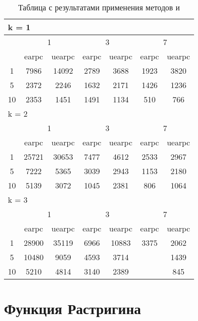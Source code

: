\begin{table}
  \centering
  \begin{tabular}{|*7{c|}}
    \hline
    \multicolumn{7}{|l|}{k = 1} \\
    \hline
    \multirow{2}{*}{\diagbox{$\mu$}{$\lambda$}} & \multicolumn{2}{c|}{1} & \multicolumn{2}{c|}{3} & \multicolumn{2}{c|}{7} \\
    \cline{2-7}
    & earpc & uearpc & earpc & uearpc & earpc & uearpc \\
    \hline
    1 & 7986 & 14092 & 2789 & 3688 & 1923 & 3820 \\
    \hline
    5 & 2372 & 2246 & 1632 & 2171 & 1426 & 1236 \\
    \hline
    10 & 2353 & 1451 & 1491 & 1134 & 510 & 766 \\
    \hline
    \multicolumn{7}{|l|}{k = 2} \\
    \hline
    \multirow{2}{*}{\diagbox{$\mu$}{$\lambda$}} & \multicolumn{2}{c|}{1} & \multicolumn{2}{c|}{3} & \multicolumn{2}{c|}{7} \\
    \cline{2-7}
    & earpc & uearpc & earpc & uearpc & earpc & uearpc \\
    \hline
    1 & 25721 & 30653 & 7477 & 4612 & 2533 & 2967 \\
    \hline
    5 & 7222 & 5365 & 3039 & 2943 & 1153 & 2180 \\
    \hline
    10 & 5139 & 3072 & 1045 & 2381 & 806 & 1064 \\
    \hline
    \multicolumn{7}{|l|}{k = 3} \\
    \hline
    \multirow{2}{*}{\diagbox{$\mu$}{$\lambda$}} & \multicolumn{2}{c|}{1} & \multicolumn{2}{c|}{3} & \multicolumn{2}{c|}{7} \\
    \cline{2-7}
    & earpc & uearpc & earpc & uearpc & earpc & uearpc \\
    \hline
    1 & 28900 & 35119 & 6966 & 10883 & 3375 & 2062 \\
    \hline
    5 & 10480 & 9059 & 4593 & 3714 & \cellcolor{olive}{594} & 1439 \\
    \hline
    10 & 5210 & 4814 & 3140 & 2389 & \cellcolor{olive}{521} & 845 \\
    \hline
  \end{tabular}
  \captionsetup{justification=centering}
  \caption{Таблица с результатами применения методов  и }
\end{table}


\section{Функция Растригина}

